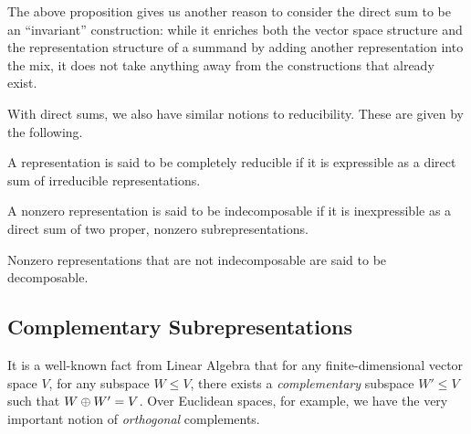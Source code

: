 The above proposition gives us another reason to consider the direct sum to be an ``invariant'' construction: while it enriches both the vector space structure and the representation structure of a summand by adding another representation into the mix, it does not take anything away from the constructions that already exist.

With direct sums, we also have similar notions to reducibility. These are given by the following.

\begin{boxdefinition}
    A representation is said to be completely reducible if it is expressible as a direct sum of irreducible representations.
\end{boxdefinition}

\begin{boxdefinition}[Indecomposability]
    A nonzero representation is said to be indecomposable if it is inexpressible as a direct sum of two proper, nonzero subrepresentations.
\end{boxdefinition}
Nonzero representations that are not indecomposable are said to be decomposable.

\subsection{Complementary Subrepresentations}

It is a well-known fact from Linear Algebra that for any finite-dimensional vector space $V$, for any subspace $W \leq V$, there exists a \textit{complementary} subspace $W' \leq V$ such that $W \oplus W' = V$. Over Euclidean spaces, for example, we have the very important notion of \textit{orthogonal} complements.

